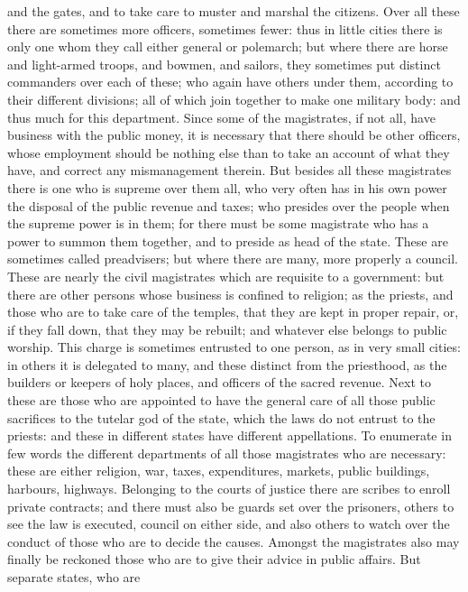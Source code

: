 and the gates, and to take care to muster and marshal the citizens. Over
all these there are sometimes more officers, sometimes fewer: thus in
little cities there is only one whom they call either general or
polemarch; but where there are horse and light-armed troops, and bowmen,
and sailors, they sometimes put distinct commanders over each of these;
who again have others under them, according to their different divisions;
all of which join together to make one military body: and thus much for
this department. Since some of the magistrates, if not all, have business
with the public money, it is necessary that there should be other
officers, whose employment should be nothing else than to take an account
of what they have, and correct any mismanagement therein. But besides all
these magistrates there is one who is supreme over them all, who very
often has in his own power the disposal of the public revenue and taxes;
who presides over the people when the supreme power is in them; for there
must be some magistrate who has a power to summon them together, and to
preside as head of the state. These are sometimes called preadvisers; but
where there are many, more properly a council. These are nearly the civil
magistrates which are requisite to a government: but there are other
persons whose business is confined to religion; as the priests, and those
who are to take care of the temples, that they are kept in proper repair,
or, if they fall down, that they may be rebuilt; and whatever else belongs
to public worship. This charge is sometimes entrusted to one person, as in
very small cities: in others it is delegated to many, and these distinct
from the priesthood, as the builders or keepers of holy places, and
officers of the sacred revenue. Next to these are those who are appointed
to have the general care of all those public sacrifices to the tutelar god
of the state, which the laws do not entrust to the priests: and these in
different states have different appellations. To enumerate in few words
the different departments of all those magistrates who are necessary:
these are either religion, war, taxes, expenditures, markets, public
buildings, harbours, highways. Belonging to the courts of justice there
are scribes to enroll private contracts; and there must also be guards set
over the prisoners, others to see the law is executed, council on either
side, and also others to watch over the conduct of those who are to decide
the causes. Amongst the magistrates also may finally be reckoned those who
are to give their advice in public affairs. But separate states, who are

